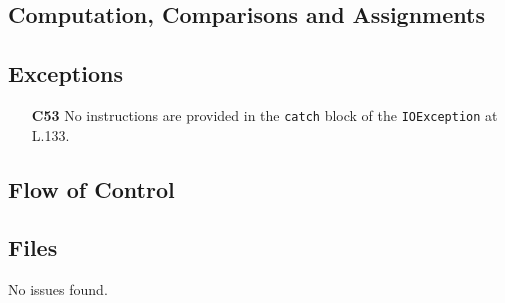\subsection{Computation, Comparisons and Assignments}
\blindtext

\subsection{Exceptions}
	\begin{itemize}
		\item[\textbf{C53}] No instructions are provided in the \texttt{catch} block of the \texttt{IOException} at L.133.
	\end{itemize}

\subsection{Flow of Control}
\blindtext

\subsection{Files}
No issues found.
